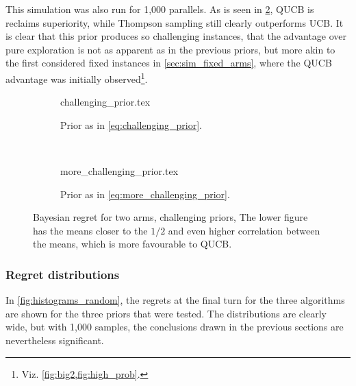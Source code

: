 This simulation was also run for 1,000 parallels.
As is seen in \cref{fig:random3}, QUCB is reclaims superiority, while Thompson sampling still clearly outperforms UCB.
It is clear that this prior produces so challenging instances, that the advantage over pure exploration is not as apparent as in the previous priors, but more akin to the first considered fixed instances in \cref{sec:sim_fixed_arms}, where the QUCB advantage was initially observed\footnote{Viz. \cref{fig:big2,fig:high_prob}.}.


\begin{figure}
    \centering
    \begin{subfigure}{\textwidth}
        \centering
        \newcommand{\myoptions}{
            width=10cm,
            height=8cm,
            xlabel={Kiloturn},
            ylabel={Regret},
            legend entries={UCB, QUCB, Thompson},
            legend pos=north west,
            legend cell align=left,
            mystyle,
            ymax = 400,
        }
        {challenging_prior.tex}
        \caption{
            Prior as in \cref{eq:challenging_prior}.
        }
        \label{fig:random2}
    \end{subfigure}
    \\[3ex]
    \begin{subfigure}{\textwidth}
        \centering
        \newcommand{\myoptions}{
            width=10cm,
            height=8cm,
            xlabel={Kiloturn},
            ylabel={Regret},
            legend entries={UCB, QUCB, Thompson},
            legend pos=north west,
            legend cell align=left,
            mystyle,
        }
        {more_challenging_prior.tex}
        \caption{
            Prior as in \cref{eq:more_challenging_prior}.
        }
        \label{fig:random3}
    \end{subfigure}
    \caption[
        Bayesian regret for two arms, challenging priors.
    ]
    {
        Bayesian regret for two arms, challenging priors,
        The lower figure has the means closer to the $1/2$ and even higher correlation between the means, which is more favourable to QUCB.
    }
    \label{fig:random_challenging}
\end{figure}

\subsubsection{Regret distributions}
In \cref{fig:histograms_random}, the regrets at the final turn for the three algorithms are shown for the three priors that were tested.
The distributions are clearly wide, but with 1,000 samples, the conclusions drawn in the previous sections are nevertheless significant.

